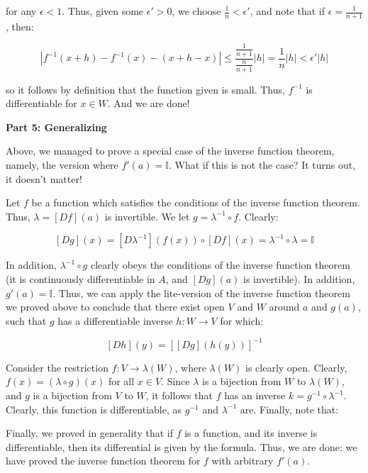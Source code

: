 \documentclass[10pt, oneside]{amsart}
\begin{document}
    for any $\epsilon < 1$. Thus, given some $\epsilon' > 0$, we choose $\frac{1}{n} < \epsilon'$, and note that if $\epsilon = \frac{1}{n + 1}$, then:

    $$|f^{-1}(x + h) - f^{-1}(x) - (x + h - x)| \leq \frac{\frac{1}{n + 1}}{\frac{n}{n + 1}} |h| = \frac{1}{n} |h| < \epsilon' |h|$$

    so it follows by definition that the function given is small. Thus, $f^{-1}$ is differentiable for $x \in W$. And we are done!

    \textbf{Part 5: Generalizing}

    Above, we managed to prove a special case of the inverse function theorem, namely, the version where $f'(a) = \mathbb{I}$. What if this is not the case? It turns out, it doesn't matter!
    \newline

    Let $f$ be a function which satisfies the conditions of the inverse function theorem. Thus, $\lambda = [Df](a)$ is invertible. We let $g = \lambda^{-1} \circ f$. Clearly:

    $$[Dg](x) = [D \lambda^{-1}](f(x)) \circ [Df](x) = \lambda^{-1} \circ \lambda = \mathbb{I}$$

    In addition, $\lambda^{-1} \circ g$ clearly obeys the conditions of the inverse function theorem (it is continuously differentiable in $A$, and $[Dg](a)$ is invertible). In addition, $g'(a) = \mathbb{I}$. Thus, we can apply
    the lite-version of the inverse function theorem we proved above to conclude that there exist open $V$ and $W$ around $a$ and $g(a)$, such that $g$ has a differentiable inverse $h : W \rightarrow V$ for which:

    $$[Dh](y) = \left[ [D g](h(y)) \right]^{-1}$$

    Consider the restriction $f : V \rightarrow \lambda(W)$, where $\lambda(W)$ is clearly open. Clearly, $f(x) = (\lambda \circ g)(x)$ for all $x \in V$. Since $\lambda$ is a bijection from $W$ to $\lambda(W)$, and
    $g$ is a bijection from $V$ to $W$, it follows that $f$ has an inverse $k = g^{-1} \circ \lambda^{-1}$. Clearly, this function is differentiable, as $g^{-1}$ and $\lambda^{-1}$ are. Finally, note that:
    \newline

    Finally, we proved in generality that if $f$ is a function, and its inverse is differentiable, then its differential is given by the formula. Thus, we are done: we have proved the inverse function theorem for $f$ with arbitrary $f'(a)$.
\end{document}
